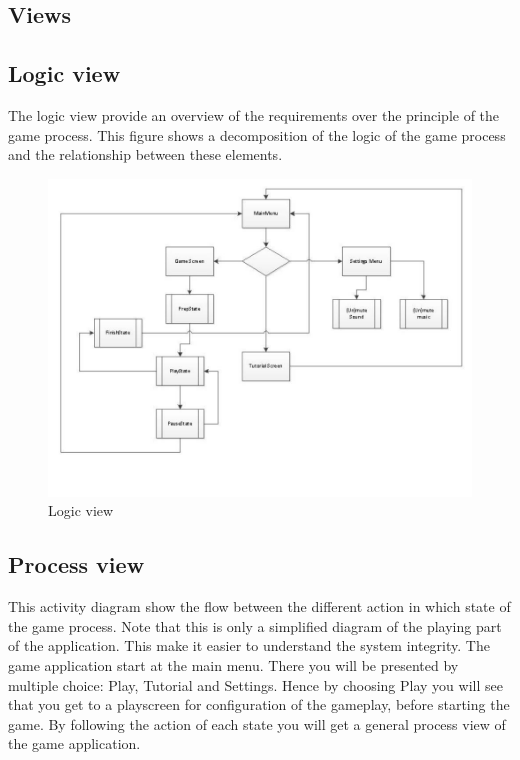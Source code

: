 \subsection{Views}	

\subsection{Logic view} 
The logic view provide an overview of the requirements over the principle of the game process. This figure shows a decomposition of the logic of the game process and the relationship between these elements.

\begin{figure}[ht!]
	\centering
	\includegraphics[width=150mm]{viewpoint.jpg}
	\caption{Logic view}
	\label{fig:view}
\end{figure}

\newpage
\subsection{Process view}
This activity diagram show the flow between the different action in which state of the game process. Note that this is only a simplified diagram of the playing part of the application. This make it easier to understand the system integrity. The game application start at the main menu. There you will be presented by multiple choice: Play, Tutorial and Settings. Hence by choosing Play you will see that you get to a playscreen for configuration of the gameplay, before starting the game. By following the action of each state you will get a general process view of the game application.


